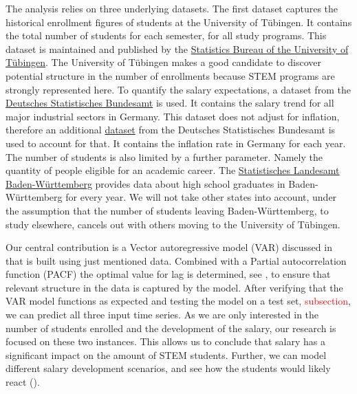 \documentclass{article}
\theoremstyle{plain}
\theoremstyle{definition}
\theoremstyle{remark}
\begin{document}
The analysis relies on three underlying datasets.
The first dataset captures the historical enrollment figures of students at the University of Tübingen. 
It contains the total number of students for each semester, for all study programs. This dataset is maintained and published by the
\href{https://uni-tuebingen.de/einrichtungen/verwaltung/iv-studierende/studierendenabteilung/statistiken/}{Statistics Bureau of the University of Tübingen}.
The University of Tübingen makes a good candidate to discover potential structure in the number
of enrollments because STEM programs are strongly represented here. %
To quantify the salary expectations, a dataset from the \href{https://www-genesis.destatis.de/genesis//online?operation=table&code=62321-0001&bypass=true&levelindex=0&levelid=1702307320529#abreadcrumb}{Deutsches Statistisches Bundesamt} is used.
It contains the salary trend for all major industrial sectors in Germany. This dataset does not adjust for inflation,
therefore an additional \href{https://www-genesis.destatis.de/genesis//online?operation=table&code=61121-0001&bypass=true&levelindex=0&levelid=1706446467491#abreadcrumb}{dataset} from the Deutsches Statistisches Bundesamt is used to account for that. It contains the inflation rate in Germany for each year.
The number of students is also limited by a further parameter. Namely the quantity of people eligible for an academic career.
The \href{https://www.statistik-bw.de/BildungKultur/SchulenAllgem/LRt0302.jsp}{Statistisches Landesamt Baden-Württemberg} provides
data about high school graduates in Baden-Württemberg for every year. We will not take other states into account, under
the assumption that the number of students leaving Baden-Württemberg, to study elsewhere, cancels out with others moving to the University of Tübingen.

Our central contribution is a Vector autoregressive model (VAR) discussed in  that is built using just mentioned data. Combined with a
Partial autocorrelation function (PACF) the optimal value for lag
is determined, see , to ensure that relevant structure in the data is captured by the model.
After verifying that the VAR model functions as expected and testing the model on a test set,  \textcolor{red}{subsection}, we
can predict all three input time series. As we are only interested in the number of students enrolled and the development of the salary, our research is 
focused on these two instances.
This allows us to conclude that salary has a significant impact on the amount of STEM students. Further, we can model different salary development scenarios, 
and see how the students would likely react ().
\end{document}

